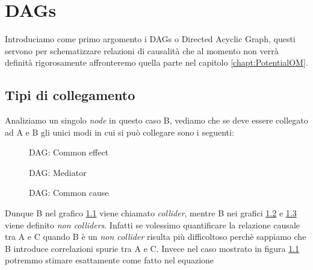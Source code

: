 \chapter{DAGs}
\label{chapt:DAGs}

Introduciamo come primo argomento i DAGs o Directed Acyclic Graph, questi servono per schematizzare relazioni di causalità che al momento non verrà   
definità rigorosamente affronteremo quella parte nel capitolo \ref{chapt:PotentialOM}.


\section{Tipi di collegamento}
Analiziamo un singolo \textit{node} in questo caso B, vediamo che se deve essere collegato ad A e B gli unici modi in cui si può collegare sono i seguenti: 
\begin{figure}[H]
\centering    
\caption{DAG: Common effect}
\label{DAG:Common effect}
\end{figure} 
\begin{figure}[H]
	\centering
\caption{DAG: Mediator}
\label{DAG:Mediator}
\end{figure} 
\begin{figure}[H]
	\centering
\caption{DAG: Common cause}
\label{DAG:Common cause}
\end{figure}

Dunque B nel grafico \ref{DAG:Common effect} viene chiamato \textit{collider}, mentre B nei grafici \ref{DAG:Mediator} e \ref{DAG:Common cause} viene definito \textit{non colliders}.
Infatti se volessimo quantificare la relazione causale tra A e C quando B è un \textit{non collider} risulta più difficoltoso perchè sappiamo che B introduce correlazioni spurie tra A e C. Invece nel caso mostrato in figura \ref{DAG:Common effect} potremmo stimare esattamente come fatto nel equazione 


